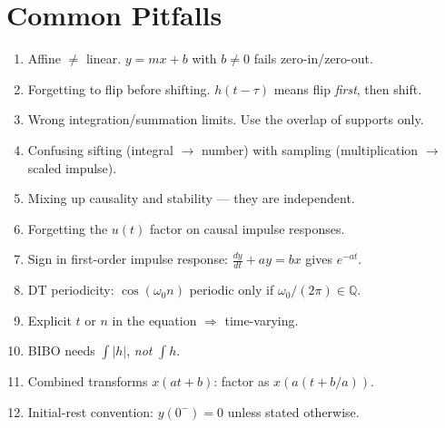 \documentclass[11pt]{article}
\begin{document}
\section{Common Pitfalls}

\begin{enumerate}[leftmargin=*]
    \item Affine $\neq$ linear. $y = mx + b$ with $b\neq 0$ fails zero-in/zero-out.
    \item Forgetting to flip before shifting. $h(t-\tau)$ means flip \emph{first}, then shift.
    \item Wrong integration/summation limits. Use the overlap of supports only.
    \item Confusing sifting (integral $\to$ number) with sampling (multiplication $\to$ scaled impulse).
    \item Mixing up causality and stability --- they are independent.
    \item Forgetting the $u(t)$ factor on causal impulse responses.
    \item Sign in first-order impulse response: $\tfrac{dy}{dt}+ay = bx$ gives $e^{-at}$.
    \item DT periodicity: $\cos(\omega_0 n)$ periodic only if $\omega_0/(2\pi)\in\mathbb{Q}$.
    \item Explicit $t$ or $n$ in the equation $\Rightarrow$ time-varying.
    \item BIBO needs $\int|h|$, \emph{not} $\int h$.
    \item Combined transforms $x(at+b)$: factor as $x(a(t+b/a))$.
    \item Initial-rest convention: $y(0^-) = 0$ unless stated otherwise.
\end{enumerate}
\end{document}
